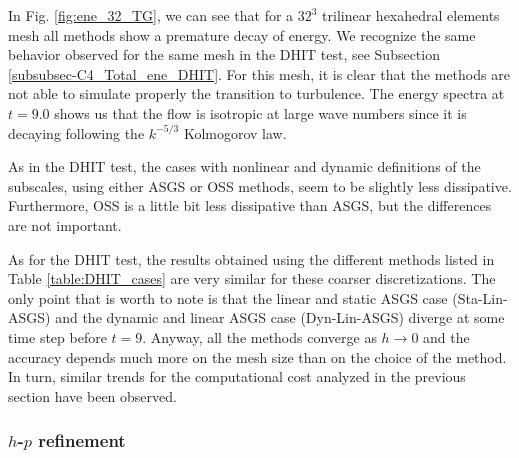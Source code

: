 In Fig. \ref{fig:ene_32_TG}, we can see that for a $32^3$ trilinear hexahedral elements mesh all methods show a premature decay of energy. We recognize the same behavior observed for the same mesh in the DHIT test, see Subsection \ref{subsubsec-C4_Total_ene_DHIT}. For this mesh, it is clear that the methods are not able to simulate properly the transition to turbulence. The energy spectra at $t=9.0$ shows us that the flow is isotropic at large wave numbers since it is decaying following the $k^{-5/3}$ Kolmogorov law. 

As in the DHIT test, the cases with nonlinear and dynamic definitions of the subscales, using either ASGS or OSS methods, seem to be slightly less dissipative. Furthermore, OSS is a little bit less dissipative than ASGS, but the differences are not important. 

As for the DHIT test, the results obtained using the different methods listed in Table \ref{table:DHIT_cases} are very similar for these coarser discretizations. The only point that is worth to note is that the linear and static ASGS case (Sta-Lin-ASGS) and the dynamic and linear ASGS case (Dyn-Lin-ASGS) diverge at some time step before $t=9$. Anyway, all the methods converge as $h\rightarrow0$ and the accuracy depends much more on the mesh size than on the choice of the method. In turn, similar trends for the computational cost analyzed in the previous section have been observed.

\subsubsection{$h$-$p$ refinement}

